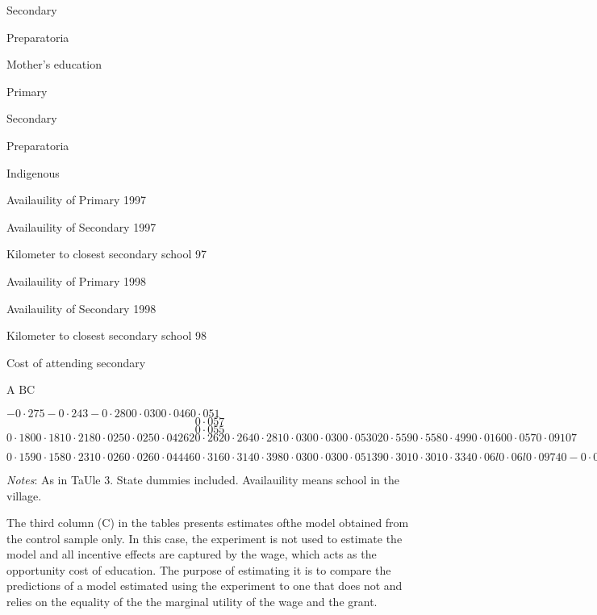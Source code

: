Secondary

Preparatoria

Mother's education

Primary

Secondary

Preparatoria

Indigenous

Availauility of Primary 1997

Availauility of Secondary 1997

Kilometer to closest secondary school 97

Availauility of Primary 1998

Availauility of Secondary 1998

Kilometer to closest secondary school 98

Cost of attending secondary

A $\mathrm{B} \mathrm{C}$

$-0\cdot 275 -0\cdot 243 -0\cdot 280 0\cdot 030 0\cdot 046 0\cdot 051$
$$
0\cdot 057
$$
$$
0\cdot 055
$$
$0\cdot 180 0\cdot 181 0\cdot 218 0\cdot 025 0\cdot 025 0\cdot 04262 0\cdot 262 0\cdot 264 0\cdot 281 0\cdot 030 0\cdot 030 0\cdot 05302 0\cdot 559 0\cdot 558 0\cdot 499 0\cdot 0160 0\cdot 057 0\cdot 09107$

$0\cdot 159 0\cdot 158 0\cdot 231 0\cdot 026 0\cdot 026 0\cdot 04446 0\cdot 316 0\cdot 314 0\cdot 398 0\cdot 030 0\cdot 030 0\cdot 05139 0\cdot 301 0\cdot 301 0\cdot 334 0\cdot 06l 0\cdot 06l 0\cdot 09740 -0\cdot 005 0\cdot 006 0\cdot 133 0\cdot 036 0\cdot 026 0\cdot 046l 0\cdot 373 0\cdot 372 0\cdot 691 0\cdot 073 0\cdot 073 0\cdot 19003 0\cdot 808 0\cdot 804 -0\cdot 568 0\cdot 188 0\cdot 188 0\cdot 349 0\cdot 00004 0\cdot 00004 -0\cdot 0002 0\cdot 00024 0\cdot 00003 0\cdot 00007 -0\cdot 261 -0\cdot 264 -0\cdot 449 0\cdot 127 0\cdot 126 0\cdot 235 -0\cdot 845 -0\cdot 841 0\cdot 516 0\cdot 187 0\cdot 187 0\cdot 348 -0\cdot 0001 -0\cdot 0001 0\cdot 00015 0\cdot 00003 0\cdot 00003 0\cdot 00007 0\cdot 00006 0\cdot 0001 -0\cdot 00019 0\cdot 00024 0\cdot 00024 0\cdot 00037$

{\it Notes}: As in TaUle 3. State dummies included. Availauility means school in the village.

The third column (C) in the tables presents estimates ofthe model obtained from the control sample only. In this case, the experiment is not used to estimate the model and all incentive effects are captured by the wage, which acts as the opportunity cost of education. The purpose of estimating it is to compare the predictions of a model estimated using the experiment to one that does not and relies on the equality of the the marginal utility of the wage and the grant.

